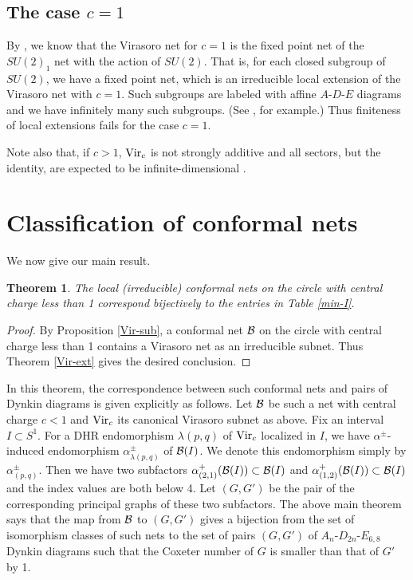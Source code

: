 \documentclass[12pt]{article}
\def\Vir{{\rm Vir}}
\def\a{\alpha}
\def\la{\lambda}
\newtheorem{theorem}{Theorem}[section]
\def\M{{\cal B}}
\begin{document}
\subsection{The case $c=1$}

By \cite{R3}, we know that the Virasoro net for $c=1$ is
the fixed point net of the $SU(2)_1$ net with the action of
$SU(2)$.
That is, for each closed subgroup of $SU(2)$, we  have a fixed
point net, which is an irreducible local
extension of the Virasoro net with $c=1$.
Such subgroups are labeled with affine $A$-$D$-$E$ diagrams
and we have infinitely many such subgroups.
(See \cite[Section 4.7.d]{GHJ}, for example.)  Thus finiteness
of local extensions fails for the case $c=1$.

Note also that, if $c>1$, $\Vir_c$ is not strongly additive \cite{BS} 
and all sectors, but the identity, are expected to be 
infinite-dimensional  \cite{R3}.

\section{Classification of conformal nets}
\label{class-diffeo}

We now give our main result.

\begin{theorem}
\label{diffeo}
The local (irreducible) conformal nets on the circle
with central charge less than 1 correspond bijectively to
the entries in Table \ref{min-I}.
\end{theorem}

\begin{proof}
By Proposition \ref{Vir-sub}, a conformal net
$\M$ on the circle with central charge less than 1
contains a Virasoro net as an irreducible subnet.
Thus Theorem \ref{Vir-ext} gives the desired conclusion.
\end{proof}

In this theorem, the correspondence between such conformal
nets and pairs of Dynkin diagrams is given explicitly as follows.
Let $\M$ be such a net with central charge $c<1$ and $\Vir_c$ 
its canonical Virasoro subnet as above.  Fix an interval $I\subset S^1$.
For a DHR endomorphism $\la{(p,q)}$ of $\Vir_c$ localized in $I$, we have
$\a^\pm$-induced endomorphism $\a^\pm_{\la{(p,q)}}$ of $\M(I)$.  We
denote this endomorphism simply by $\a^\pm_{(p,q)}$.  Then
we have two subfactors $\a^+_{(2,1)}(\M(I))\subset \M(I)$ and
$\a^+_{(1,2)}(\M(I))\subset \M(I)$ and the index values are both below
4.  Let $(G, G')$ be the pair of the corresponding principal graphs
of these two subfactors.  The above main theorem says that the map
from $\M$ to $(G,G')$ gives a bijection from the set of isomorphism
classes of such nets to the set of pairs $(G,G')$ of
$A_n$-$D_{2n}$-$E_{6,8}$ Dynkin diagrams such that the Coxeter 
number of $G$ is smaller than that of $G'$ by 1.
\end{document}
